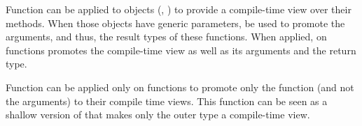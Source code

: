 Function  can be applied to objects (\eg, ) to provide a compile-time
 view over their methods. When those objects have generic parameters,  be used
 to promote the arguments, and thus, the result types of these functions. When applied,
 on functions  promotes the compile-time view as well as its arguments
 and the return type.

Function  can be applied only on functions to promote only the function
(and not the arguments) to their compile time views. This function can be seen as a shallow
version of  that makes only the outer type a compile-time view.
